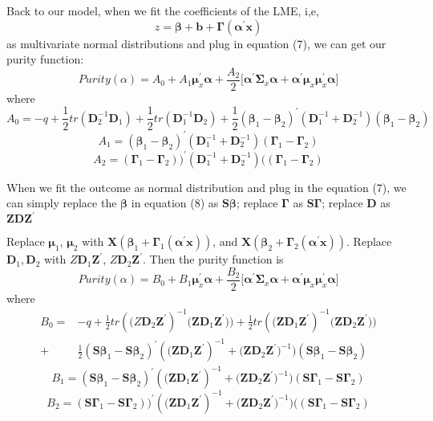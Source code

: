 \documentclass[11pt]{article}
\begin{document}
\noindent
Back to our model, when 
we fit the coefficients of the LME, i,e, 
$$z = \bm \beta + \bm b + \bm \Gamma (\bm {\alpha^\prime x})$$ as multivariate normal distributions and plug in equation (7), we can get our purity function: 
\begin{equation} \label{eq7}
    Purity( \alpha)=  A_0 + A_1 \bm \mu_x ^\prime \bm \alpha + \frac{A_2}{2} \big[\bm \alpha^\prime \bm \Sigma_x \bm \alpha + \bm \alpha^\prime \bm \mu_x \bm \mu_x^\prime \bm \alpha \big]
\end{equation}
where $$A_0 = -q + \frac{1}{2}tr(\bm D_2^{-1} \bm D_1) +\frac{1}{2}tr(\bm D_1^{-1} \bm D_2)+ \frac{1}{2} (\bm \beta_1 - \bm \beta_2) ^{\prime}  (\bm D_1^{-1} + \bm D_2^{-1}) (\bm \beta_1 - \bm \beta_2)$$
$$A_1 = (\bm \beta_1 - \bm \beta_2) ^{\prime}  (\bm D_1^{-1} + \bm D_2^{-1}) (\bm \Gamma_1 - \bm \Gamma_2)$$
$$A_2 = (\bm \Gamma_1 - \bm \Gamma_2)  \big) ^{\prime}(\bm D_1^{-1} + \bm D_2^{-1}) \big((\bm \Gamma_1 - \bm \Gamma_2)$$

\noindent
When we fit  the outcome as normal distribution and plug in the equation (7), we can simply replace the $\bm \beta$ in equation (8) as $\bm S \bm \beta$; replace $\bm \Gamma$ as $\bm S \bm \Gamma$; replace $\bm D$ as $\bm Z \bm D \bm Z^\prime$


\noindent
Replace $\bm \mu_1$, $\bm \mu_2$ with $\bm X (\bm \beta_1+ \bm \Gamma_1 (\bm \alpha^\prime \bm x))$, and $\bm X (\bm \beta_2+ \bm \Gamma_2 (\bm \alpha^\prime \bm x))$. Replace $\bm D_1, \bm D_2$ with $Z \bm D_1 \bm Z^\prime$, $Z \bm D_2 \bm Z^\prime$. Then the purity function is 
\begin{equation}
    Purity( \alpha)=  B_0 + B_1 \bm \mu_x ^\prime \bm \alpha + \frac{B_2}{2} \big[\bm \alpha^\prime \bm \Sigma_x \bm \alpha + \bm \alpha^\prime \bm \mu_x \bm \mu_x^\prime \bm \alpha \big]
\end{equation}
where 
$$\begin{aligned}
B_0 = & -q + \frac{1}{2}tr(\bm (Z \bm D_2 \bm Z^\prime)^{-1} \bm ( \bm Z \bm D_1 \bm Z^\prime)) +\frac{1}{2}tr(\bm (\bm  Z \bm D_1 \bm Z^\prime)^{-1} \bm ( \bm  Z \bm D_2 \bm Z^\prime)) \\+ & \frac{1}{2} (\bm S \bm \beta_1 - \bm S \bm \beta_2) ^{\prime}  (\bm ( \bm  Z \bm D_1 \bm Z^\prime)^{-1} + \bm ( \bm  Z \bm D_2 \bm Z^\prime)^{-1}) (\bm S \bm \beta_1 - \bm S \bm \beta_2)\end{aligned}$$
$$B_1 = (\bm S \bm \beta_1 - \bm S \bm \beta_2) ^{\prime}  (\bm (\bm  Z \bm D_1 \bm Z^\prime)^{-1} + \bm (\bm  Z \bm D_2 \bm Z^\prime)^{-1}) (\bm S \bm \Gamma_1 - \bm S \bm \Gamma_2)$$
$$B_2 = (\bm S \bm \Gamma_1 - \bm S \bm \Gamma_2)  \big) ^{\prime}(\bm (\bm  Z \bm D_1 \bm Z^\prime)^{-1} + \bm (\bm  Z \bm D_2 \bm Z^\prime)^{-1}) \big((\bm S \bm \Gamma_1 - \bm S\bm \Gamma_2)$$





\end{document}

